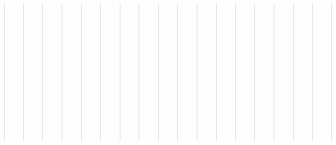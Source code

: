 \documentclass[letterpaper,10pt,english]{sphinxmanual}
\begin{document}
\begin{quote}
\begin{quote}
\begin{quote}
\begin{quote}
\begin{quote}
\begin{quote}
\begin{quote}
\begin{quote}
\begin{quote}
\begin{quote}
\begin{quote}
\begin{quote}
\begin{quote}
\begin{quote}
\begin{quote}
\begin{quote}
\begin{quote}
\begin{quote}
\begin{quote}
\begin{quote}
\begin{quote}
\begin{quote}
\begin{quote}
\begin{quote}
\begin{quote}
\begin{quote}
\begin{quote}
\begin{quote}
\begin{quote}
\begin{quote}
\begin{quote}
\begin{quote}
\begin{quote}
\begin{quote}
\begin{quote}
\begin{quote}
\begin{quote}
\begin{quote}
\begin{quote}
\begin{quote}
\begin{quote}
\begin{quote}
\begin{quote}
\begin{quote}
\begin{quote}
\begin{quote}
\begin{quote}
\begin{quote}
\begin{quote}
\begin{quote}
\begin{quote}
\begin{quote}
\begin{quote}
\begin{quote}
\begin{quote}
\begin{quote}
\begin{quote}
\begin{quote}
\begin{quote}
\begin{quote}
\begin{quote}
\begin{quote}
\begin{quote}
\begin{quote}
\begin{quote}
\begin{quote}
\begin{quote}
\begin{quote}
\begin{quote}
\begin{quote}
\begin{quote}
\begin{quote}
\begin{quote}
\begin{quote}
\begin{quote}
\begin{quote}
\begin{quote}
\begin{quote}
\begin{quote}
\begin{quote}
\begin{quote}
\begin{quote}
\begin{quote}
\begin{quote}
\begin{quote}
\begin{quote}
\begin{quote}
\begin{quote}
\begin{quote}
\begin{quote}
\begin{quote}
\begin{quote}
\begin{quote}
\begin{savenotes}
\begin{longtable}[c]{|||}
\begin{savenotes}
\begin{longtable}[c]{|||||||}
\begin{savenotes}
\begin{longtable}[c]{|||}
\begin{savenotes}
\begin{longtable}[c]{|||}
page}}}\\
\endfoot

\endlastfoot

\sphinxAtStartPar
1
&
\sphinxAtStartPar
Adana
\\
\hline
\sphinxAtStartPar
2
&
\sphinxAtStartPar
Adıyaman
\\
\hline
\sphinxAtStartPar
3
&
\sphinxAtStartPar
Afyonkarahisar
\\
\hline
\sphinxAtStartPar
4
&
\sphinxAtStartPar
Ağrı
\\
\hline
\sphinxAtStartPar
5
&
\sphinxAtStartPar
Amasya
\\
\hline
\sphinxAtStartPar
6
&
\sphinxAtStartPar
Ankara
\\
\hline
\sphinxAtStartPar
7
&
\sphinxAtStartPar
Antalya
\\
\hline
\sphinxAtStartPar
8
&
\sphinxAtStartPar
Artvin
\\
\hline
\sphinxAtStartPar
9
&
\sphinxAtStartPar
Aydın
\\
\hline
\sphinxAtStartPar
10
&
\sphinxAtStartPar
Balıkesir
\\
\hline
\sphinxAtStartPar
11
&
\sphinxAtStartPar
Bilecik
\\
\hline
\sphinxAtStartPar
12
&
\sphinxAtStartPar
Bingöl
\\
\hline
\sphinxAtStartPar
13
&
\sphinxAtStartPar
Bitlis
\\
\hline
\sphinxAtStartPar
14
&
\sphinxAtStartPar
Bolu
\\
\hline
\sphinxAtStartPar
15
&
\sphinxAtStartPar
Burdur
\\
\hline
\sphinxAtStartPar
16
&
\sphinx
\end{longtable}
\end{savenotes}
\end{longtable}
\end{savenotes}
\end{longtable}
\end{savenotes}
\end{longtable}
\end{savenotes}
\end{quote}
\end{quote}
\end{quote}
\end{quote}
\end{quote}
\end{quote}
\end{quote}
\end{quote}
\end{quote}
\end{quote}
\end{quote}
\end{quote}
\end{quote}
\end{quote}
\end{quote}
\end{quote}
\end{quote}
\end{quote}
\end{quote}
\end{quote}
\end{quote}
\end{quote}
\end{quote}
\end{quote}
\end{quote}
\end{quote}
\end{quote}
\end{quote}
\end{quote}
\end{quote}
\end{quote}
\end{quote}
\end{quote}
\end{quote}
\end{quote}
\end{quote}
\end{quote}
\end{quote}
\end{quote}
\end{quote}
\end{quote}
\end{quote}
\end{quote}
\end{quote}
\end{quote}
\end{quote}
\end{quote}
\end{quote}
\end{quote}
\end{quote}
\end{quote}
\end{quote}
\end{quote}
\end{quote}
\end{quote}
\end{quote}
\end{quote}
\end{quote}
\end{quote}
\end{quote}
\end{quote}
\end{quote}
\end{quote}
\end{quote}
\end{quote}
\end{quote}
\end{quote}
\end{quote}
\end{quote}
\end{quote}
\end{quote}
\end{quote}
\end{quote}
\end{quote}
\end{quote}
\end{quote}
\end{quote}
\end{quote}
\end{quote}
\end{quote}
\end{quote}
\end{quote}
\end{quote}
\end{quote}
\end{quote}
\end{quote}
\end{quote}
\end{quote}
\end{quote}
\end{quote}
\end{quote}
\end{quote}
\end{quote}
\end{document}
